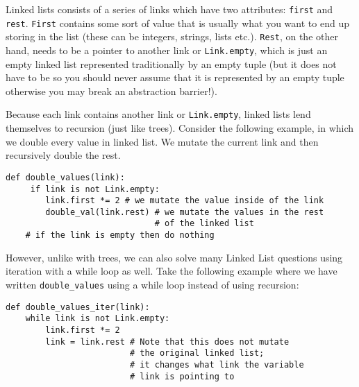 \begin{blocksection}
Linked lists consists of a series of links which have two attributes: \lstinline{first} and \lstinline{rest}. \lstinline{First} contains some sort of value that is usually what you want to end up storing in the list (these can be integers, strings, lists etc.). \lstinline{Rest}, on the other hand, needs to be a pointer to another link or \lstinline{Link.empty}, which is just an empty linked list represented traditionally by an empty tuple (but it does not have to be so you should never assume that it is represented by an empty tuple otherwise you may break an abstraction barrier!).

Because each link contains another link or \lstinline{Link.empty}, linked lists lend themselves to recursion (just like trees). Consider the following example, in which we double every value in linked list. We mutate the current link and then recursively double the rest. 
\vspace{1.5mm}
\begin{lstlisting}
def double_values(link): 
     if link is not Link.empty:
        link.first *= 2 # we mutate the value inside of the link
        double_val(link.rest) # we mutate the values in the rest 
                              # of the linked list
    # if the link is empty then do nothing
\end{lstlisting}

However, unlike with trees, we can also solve many Linked List questions using iteration with a while loop as well. Take the following example where we have written \lstinline{double_values} using a while loop instead of using recursion:
\vspace{1.5mm}
\begin{lstlisting}
def double_values_iter(link):
    while link is not Link.empty:
        link.first *= 2
        link = link.rest # Note that this does not mutate 
                         # the original linked list; 
                         # it changes what link the variable 
                         # link is pointing to
\end{lstlisting}
\end{blocksection}